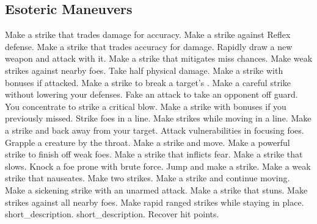 
\small
\subsection{Esoteric Maneuvers}\label{Esoteric Maneuvers}
\begin{spelllist}
 Make a strike that trades damage for accuracy.
 Make a strike against Reflex defense.
 Make a strike that trades accuracy for damage.
 Rapidly draw a new weapon and attack with it.
 Make a strike that mitigates miss chances.
 Make weak strikes against nearby foes.
 Take half physical damage.
 Make a strike with bonuses if attacked.
 Make a strike to break a target's .
 Make a careful strike without lowering your defenses.
 Fake an attack to take an opponent off guard.
 You concentrate to strike a critical blow.
 Make a strike with bonuses if you previously missed.
 Strike foes in a line.
 Make strikes while moving in a line.
 Make a strike and back away from your target.
 Attack vulnerabilities in focusing foes.
 Grapple a creature by the throat.
 Make a strike and move.
 Make a powerful strike to finish off weak foes.
 Make a strike that inflicts fear.
 Make a strike that slows.
 Knock a foe prone with brute force.
 Jump and make a strike.
 Make a weak strike that nauseates.
 Make two strikes.
 Make a strike and continue moving.
 Make a sickening strike with an unarmed attack.
 Make a strike that stuns.
 Make strikes against all nearby foes.
 Make rapid ranged strikes while staying in place.
 short_description.
 short_description.
 Recover hit points.

\end{spelllist}
